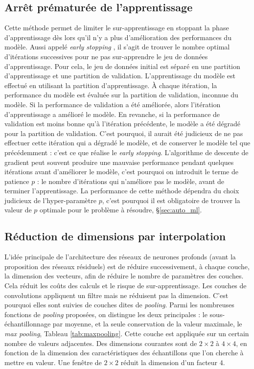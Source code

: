 \subsection{Arrêt prématurée de l'apprentissage} \label{parag:early_stopping}
Cette méthode permet de limiter le sur-apprentissage en stoppant la phase d'apprentissage dès lors qu'il n'y a plus d'amélioration des performances du modèle.
Aussi appelé \textit{early stopping} \cite{yao_early_2007}, il s'agit de trouver le nombre optimal d'itérations successives pour ne pas sur-apprendre le jeu de données d'apprentissage.
Pour cela, le jeu de données initial est séparé en une partition d'apprentissage et une partition de validation.
L'apprentissage du modèle est effectué en utilisant la partition d'apprentissage.
À chaque itération, la performance du modèle est évaluée sur la partition de validation, inconnue du modèle.
Si la performance de validation a été améliorée, alors l'itération d'apprentissage a amélioré le modèle.
En revanche, si la performance de validation est moins bonne qu'à l'itération précédente, le modèle a été dégradé pour la partition de validation.
C'est pourquoi, il aurait été judicieux de ne pas effectuer cette itération qui a dégradé le modèle, et de conserver le modèle tel que précédemment : c'est ce que réalise le \textit{early stopping}.
L'algorithme de descente de gradient peut souvent produire une mauvaise performance pendant quelques itérations avant d'améliorer le modèle, c'est pourquoi on introduit le terme de patience $p$ : le nombre d'itérations qui n'améliore pas le modèle, avant de terminer l'apprentissage.
La performance de cette méthode dépendra du choix judicieux de l'hyper-paramètre $p$, c'est pourquoi il est obligatoire de trouver la valeur de $p$ optimale pour le problème à résoudre, §\ref{sec:auto_ml}.

\subsection{Réduction de dimensions par interpolation} \label{parag:pooling}
L'idée principale de l'architecture des réseaux de neurones profonds (avant la proposition des réseaux résiduels) est de réduire successivement, à chaque couche, la dimension des vecteurs, afin de réduire le nombre de paramètres des couches. Cela réduit les coûts des calculs et le risque de sur-apprentissage.
Les couches de convolutions appliquent un filtre mais ne réduisent pas la dimension.
C'est pourquoi elles sont suivies de couches dites de \textit{pooling}. Parmi les nombreuses fonctions de \textit{pooling} proposées, on distingue les deux principales : le sous-échantillonnage par moyenne, et la seule conservation de la valeur maximale, le \textit{max pooling}, Tableau \ref{tab:maxpooling}.
Cette couche est appliquée sur un certain nombre de valeurs adjacentes.
Des dimensions courantes sont de $2 \times 2$ à $4 \times 4$, en fonction de la dimension des caractéristiques des échantillons que l'on cherche à mettre en valeur.
Une fenêtre de $2 \times 2$ réduit la dimension d'un facteur 4.

